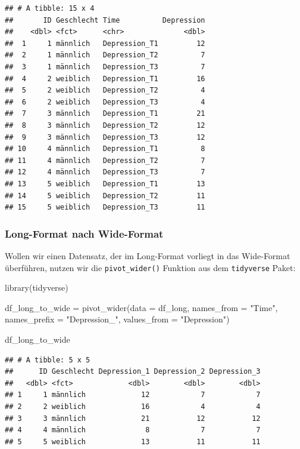 \documentclass[
]{book}
\newenvironment{Shaded}{\begin{snugshade}}{\end{snugshade}}
\newcommand{\AttributeTok}[1]{\textcolor[rgb]{0.77,0.63,0.00}{#1}}
\newcommand{\FunctionTok}[1]{\textcolor[rgb]{0.00,0.00,0.00}{#1}}
\newcommand{\NormalTok}[1]{#1}
\newcommand{\OtherTok}[1]{\textcolor[rgb]{0.56,0.35,0.01}{#1}}
\newcommand{\StringTok}[1]{\textcolor[rgb]{0.31,0.60,0.02}{#1}}
\begin{document}
\begin{verbatim}
## # A tibble: 15 x 4
##       ID Geschlecht Time          Depression
##    <dbl> <fct>      <chr>              <dbl>
##  1     1 männlich   Depression_T1         12
##  2     1 männlich   Depression_T2          7
##  3     1 männlich   Depression_T3          7
##  4     2 weiblich   Depression_T1         16
##  5     2 weiblich   Depression_T2          4
##  6     2 weiblich   Depression_T3          4
##  7     3 männlich   Depression_T1         21
##  8     3 männlich   Depression_T2         12
##  9     3 männlich   Depression_T3         12
## 10     4 männlich   Depression_T1          8
## 11     4 männlich   Depression_T2          7
## 12     4 männlich   Depression_T3          7
## 13     5 weiblich   Depression_T1         13
## 14     5 weiblich   Depression_T2         11
## 15     5 weiblich   Depression_T3         11
\end{verbatim}

\hypertarget{long-format-nach-wide-format}{%
\subsubsection{Long-Format nach Wide-Format}\label{long-format-nach-wide-format}}

Wollen wir einen Datensatz, der im Long-Format vorliegt in das Wide-Format überführen, nutzen wir die \texttt{pivot\_wider()} Funktion aus dem \texttt{tidyverse} Paket:

\begin{Shaded}
\begin{Highlighting}[]
\FunctionTok{library}\NormalTok{(tidyverse)}

\NormalTok{df\_long\_to\_wide }\OtherTok{=} \FunctionTok{pivot\_wider}\NormalTok{(}\AttributeTok{data =}\NormalTok{ df\_long, }
                              \AttributeTok{names\_from =} \StringTok{"Time"}\NormalTok{,}
                              \AttributeTok{names\_prefix =} \StringTok{"Depression\_"}\NormalTok{,}
                              \AttributeTok{values\_from =} \StringTok{"Depression"}\NormalTok{)}

\NormalTok{df\_long\_to\_wide}
\end{Highlighting}
\end{Shaded}

\begin{verbatim}
## # A tibble: 5 x 5
##      ID Geschlecht Depression_1 Depression_2 Depression_3
##   <dbl> <fct>             <dbl>        <dbl>        <dbl>
## 1     1 männlich             12            7            7
## 2     2 weiblich             16            4            4
## 3     3 männlich             21           12           12
## 4     4 männlich              8            7            7
## 5     5 weiblich             13           11           11
\end{verbatim}
\end{document}
